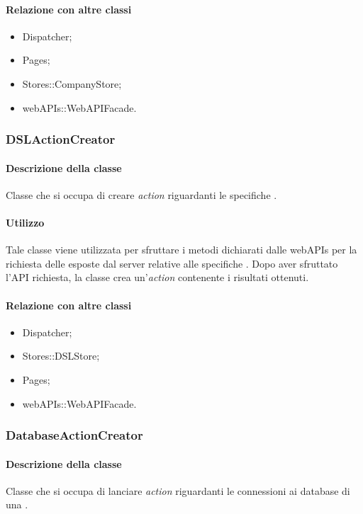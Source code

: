 \paragraph*{Relazione con altre classi}
\begin{itemize}
\item Dispatcher;
\item Pages;
\item Stores::CompanyStore;
\item webAPIs::WebAPIFacade.
\end{itemize}

\subsubsection{DSLActionCreator}
\paragraph*{Descrizione della classe}
Classe che si occupa di creare \textit{action} riguardanti le specifiche .
\paragraph*{Utilizzo}
Tale classe viene utilizzata per sfruttare i metodi dichiarati dalle webAPIs per la richiesta delle  esposte dal server relative alle specifiche . Dopo aver sfruttato l'API richiesta, la classe crea un'\textit{action} contenente i risultati ottenuti.

\paragraph*{Relazione con altre classi}
\begin{itemize}
\item Dispatcher;
\item Stores::DSLStore;
\item Pages;
\item webAPIs::WebAPIFacade.
\end{itemize}

\subsubsection{DatabaseActionCreator}
\paragraph*{Descrizione della classe}
Classe che si occupa di lanciare \textit{action} riguardanti le connessioni ai database di una .
